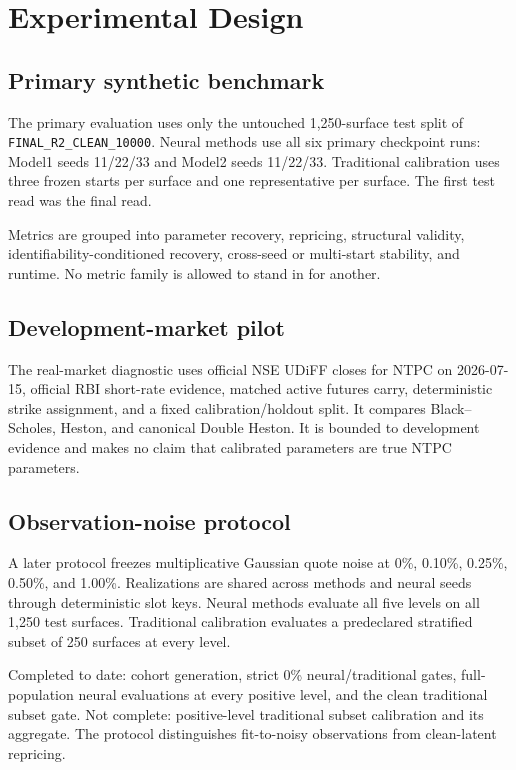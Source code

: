 \section{Experimental Design}
\label{sec:experimental-design}

\subsection{Primary synthetic benchmark}
The primary evaluation uses only the untouched 1{,}250-surface test split of
\texttt{FINAL\_R2\_CLEAN\_10000}. Neural methods use all six primary checkpoint runs:
Model1 seeds 11/22/33 and Model2 seeds 11/22/33. Traditional calibration uses three
frozen starts per surface and one representative per surface. The first test read was
the final read.

Metrics are grouped into parameter recovery, repricing, structural validity,
identifiability-conditioned recovery, cross-seed or multi-start stability, and runtime.
No metric family is allowed to stand in for another.

\subsection{Development-market pilot}
The real-market diagnostic uses official NSE UDiFF closes for NTPC on 2026-07-15,
official RBI short-rate evidence, matched active futures carry, deterministic strike
assignment, and a fixed calibration/holdout split. It compares Black--Scholes, Heston,
and canonical Double Heston. It is bounded to development evidence and makes no claim
that calibrated parameters are true NTPC parameters.

\subsection{Observation-noise protocol}
A later protocol freezes multiplicative Gaussian quote noise at 0\%, 0.10\%, 0.25\%,
0.50\%, and 1.00\%. Realizations are shared across methods and neural seeds through
deterministic slot keys. Neural methods evaluate all five levels on all 1{,}250 test
surfaces. Traditional calibration evaluates a predeclared stratified subset of 250
surfaces at every level.

Completed to date: cohort generation, strict 0\% neural/traditional gates, full-
population neural evaluations at every positive level, and the clean traditional subset
gate. Not complete: positive-level traditional subset calibration and its aggregate.
The protocol distinguishes fit-to-noisy observations from clean-latent repricing.

